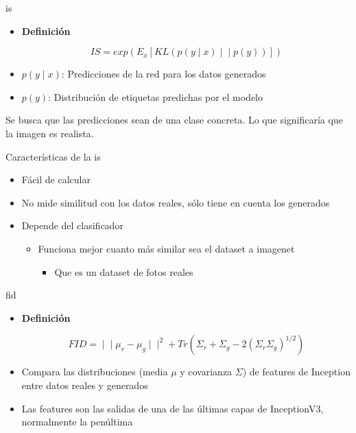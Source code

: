 \begin{frame}{\gls{is} \cite{salimans2016improved}}
\begin{itemize}
    \item \alert{\textbf{Definición}}

    \begin{equation}
        IS=exp(E_x[KL(p(y∣x)∣∣p(y))])
    \end{equation}

    \item \alert{$p(y∣x)$}: Predicciones de la red para los datos generados
    \item \alert{$p(y)$}: Distribución de etiquetas predichas por el modelo
\end{itemize}
Se busca que las \alert{predicciones} sean de una \alert{clase concreta}. Lo que significaría que la imagen es \alert{realista}.
\end{frame}

\begin{frame}{Características de la \gls{is} \cite{salimans2016improved}}
\begin{itemize}
    \item \alert{Fácil de calcular}
    \item No mide \alert{similitud} con los datos reales, sólo tiene en cuenta los generados
    \item \alert{Depende del clasificador}
    \begin{itemize}
        \item Funciona mejor cuanto más similar sea el dataset a imagenet
        \begin{itemize}
            \item Que es un dataset de fotos reales
        \end{itemize}
    \end{itemize}
\end{itemize}
\end{frame}

\begin{frame}{\gls{fid} \cite{heusel2017gans}}
\begin{itemize}
    \item \alert{\textbf{Definición}}

    \begin{equation}
        FID=∣∣\mu_r −\mu_g ∣∣^2+Tr(\Sigma_r +\Sigma_g −2(\Sigma_r \Sigma_g )^{1/2})
    \end{equation}

    \item Compara las \alert{distribuciones} (media $\mu$ y covarianza $\Sigma$) de features de Inception entre datos reales y generados
    \item Las features son las salidas de una de \alert{las últimas capas} de InceptionV3, normalmente la penúltima
\end{itemize}
\end{frame}

